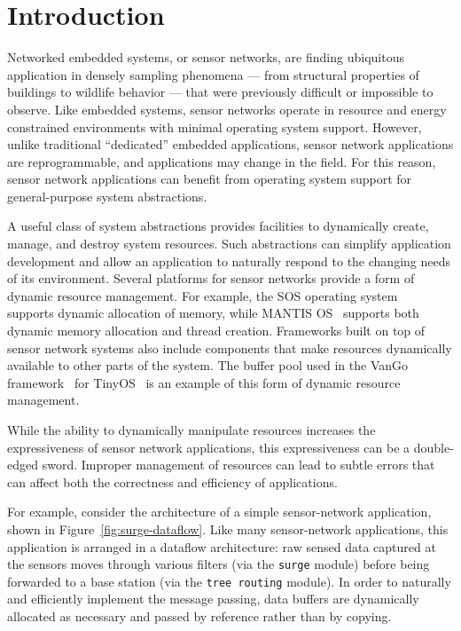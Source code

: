 \section{Introduction}
\label{sec:intro}

Networked embedded systems, or sensor networks, are finding ubiquitous application in densely
sampling phenomena --- from structural properties of buildings to 
wildlife behavior --- that were previously difficult or impossible to observe.
Like embedded systems, sensor networks operate in resource and energy 
constrained environments with minimal operating system support.
However, unlike traditional ``dedicated'' embedded applications, sensor network
applications are reprogrammable, and applications may change in the field. 
For this reason, sensor network applications can benefit from
operating system support for 
general-purpose system abstractions.

A useful class of system abstractions provides facilities
to dynamically create, manage, and destroy system resources.
Such abstractions can simplify application
development and allow an application to naturally respond to
the changing needs of its environment.  Several platforms for sensor networks
provide a form of dynamic resource management.  For
example, the SOS operating system~\cite{sos} supports dynamic
allocation of memory, while MANTIS OS~\cite{abrach03mantis} supports both dynamic
memory allocation and thread creation.  Frameworks built on top of sensor
network systems also include components
that make resources dynamically available to other parts of
the system.  The buffer pool
used in the VanGo framework~\cite{greenstein05vango} for TinyOS~\cite{TinyOS}
is an example of this form of dynamic resource management.

While the ability to dynamically manipulate resources increases the
expressiveness of sensor network applications, this expressiveness can
be a double-edged sword.  Improper management of resources can lead to
subtle errors that can affect both the correctness and efficiency of
applications.


For example, consider the architecture of a simple
sensor-network application,
shown in Figure~\ref{fig:surge-dataflow}.
Like many sensor-network applications, this application
is arranged in a dataflow architecture:  raw sensed
data captured at the sensors moves through various filters (via the
{\tt surge} module) before being forwarded to a base station (via the
{\tt tree routing} module).  
In order to naturally and
efficiently implement the message passing, data buffers
are dynamically allocated as necessary and
passed by reference rather than by copying.

